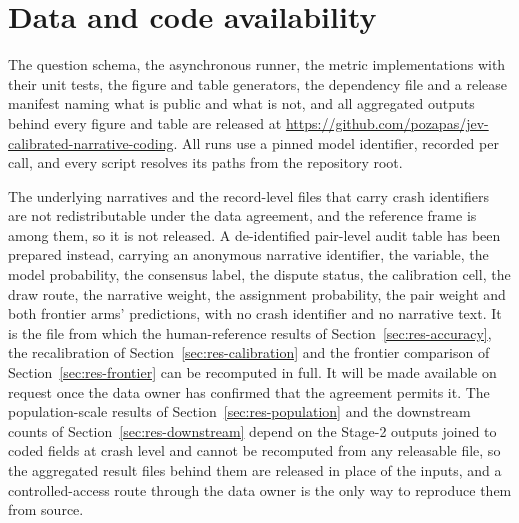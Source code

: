\documentclass[a4paper,fleqn]{cas-sc}
\begin{document}
%

\section*{Data and code availability}
The question schema, the asynchronous runner, the metric implementations with their unit
tests, the figure and table generators, the dependency file and a release manifest naming what
is public and what is not, and all aggregated outputs behind every figure and table are
released at \url{https://github.com/pozapas/jev-calibrated-narrative-coding}. All runs use a
pinned model identifier, recorded per call, and every script resolves its paths from the
repository root.

The underlying narratives and the record-level files that carry crash identifiers are not
redistributable under the data agreement, and the reference frame is among them, so it is not
released. A de-identified pair-level audit table has been prepared instead, carrying an
anonymous narrative identifier, the variable, the model probability, the consensus label, the
dispute status, the calibration cell, the draw route, the narrative weight, the assignment
probability, the pair weight and both frontier arms' predictions, with no crash identifier and
no narrative text. It is the file from which the human-reference results of
Section~\ref{sec:res-accuracy}, the recalibration of Section~\ref{sec:res-calibration} and the
frontier comparison of Section~\ref{sec:res-frontier} can be recomputed in full. It will be
made available on request once the data owner has confirmed that the agreement permits it. The
population-scale results of Section~\ref{sec:res-population} and the downstream counts of
Section~\ref{sec:res-downstream} depend on the Stage-2 outputs joined to coded fields at crash
level and cannot be recomputed from any releasable file, so the aggregated result files behind
them are released in place of the inputs, and a controlled-access route through the data owner
is the only way to reproduce them from source.
\end{document}
